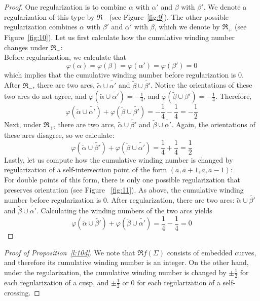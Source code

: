 \documentclass[12pt]{amsart}
\theoremstyle{definition}
\begin{document}
{\begin{proof}
One regularization is to combine $\alpha$ with $\alpha'$ and $\beta$ with $\beta'$.  We denote a regularization of this type by $\Re_-$ (see Figure~\ref{fig:9}).  The other possible regularization combines $\alpha$ with $\beta'$ and $\alpha'$ with $\beta$,  which we denote by $\Re_+$ (see Figure~\ref{fig:10}).  Let us first calculate how the cumulative winding number changes under $\Re_-$: \\ 
 Before regularization,  we calculate that $$\varphi(\alpha) = \varphi(\beta) = \varphi(\alpha') = \varphi(\beta') = 0 $$ which implies that the cumulative winding number before regularization is $0$.  After $\Re_-$,  there are two arcs,  $\tilde{\alpha} \cup \tilde{\alpha'}$ and $\tilde{\beta} \cup \tilde{\beta'}$.  Notice the orientations of these two arcs do not agree,  and $\varphi(\tilde{\alpha} \cup \tilde{\alpha'}) =  -\frac{1}{4}$,  and $\varphi(\tilde{\beta} \cup \tilde{\beta'}) = -\frac{1}{4}$.  Therefore,  $$ \varphi(\tilde{\alpha} \cup \tilde{\alpha'}) + \varphi(\tilde{\beta} \cup \tilde{\beta'}) =  -\frac{1}{4} - \frac{1}{4} = -\frac{1}{2}$$
Next,  under $\Re_+$,  there are two arcs,  $\tilde{\alpha} \cup \tilde{\beta'}$ and $\tilde{\beta} \cup \tilde{\alpha'}$.  Again,  the orientations of these arcs disagree,  so we calculate:
$$ \varphi(\tilde{\alpha} \cup \tilde{\beta'}) + \varphi(\tilde{\beta} \cup \tilde{\alpha'}) =  \frac{1}{4} + \frac{1}{4} = \frac{1}{2}$$
Lastly,  let us compute how the cumulative winding number is changed by regularization of a self-intersection point of the form $(a, a+1, a, a-1)$: \\
For double points of this form,  there is only one possible regularization that preserves orientation (see Figure ~\ref{fig:11}).  As above,   the cumulative winding number before regularization is $0$.  After regularization,  there are two arcs: $\tilde{\alpha} \cup \tilde{\beta'}$ and $\tilde{\beta} \cup \tilde{\alpha'}$.  Calculating the winding numbers of the two arcs yields
$$ \varphi(\tilde{\alpha} \cup \tilde{\beta'}) + \varphi(\tilde{\beta} \cup \tilde{\alpha'}) =  \frac{1}{4} - \frac{1}{4} = 0$$ \fi
\end{proof}



\begin{proof}[Proof of Proposition~\ref{l:10d}] We note that $\Re f(\Sigma)$ consists of embedded curves, and therefore its cumulative winding number is an integer. On the other hand, under the regularization, the cumulative winding number is changed by $\pm \frac{1}{2}$ for each regularization of a cusp, and $\pm \frac{1}{2}$ or $0$ for each regularization of a self-crossing. 
\end{proof}


}
\end{document}
